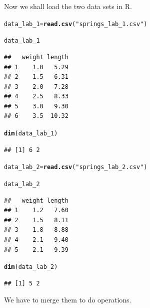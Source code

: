 \documentclass[11pt, a4paper]{article}\usepackage[]{graphicx}\usepackage[]{xcolor}
\makeatletter
\newcommand{\hlsng}[1]{\textcolor[rgb]{0.192,0.494,0.8}{#1}}%
\newcommand{\hldef}[1]{\textcolor[rgb]{0.345,0.345,0.345}{#1}}%
\newcommand{\hlkwb}[1]{\textcolor[rgb]{0.69,0.353,0.396}{#1}}%
\newcommand{\hlkwd}[1]{\textcolor[rgb]{0.737,0.353,0.396}{\textbf{#1}}}%
\newenvironment{kframe}{%
 \def\at@end@of@kframe{}%
 \ifinner\ifhmode%
  \def\at@end@of@kframe{\end{minipage}}%
  \begin{minipage}{\columnwidth}%
 \fi\fi%
 \def\FrameCommand##1{\hskip\@totalleftmargin \hskip-\fboxsep
 \colorbox{shadecolor}{##1}\hskip-\fboxsep
     \hskip-\linewidth \hskip-\@totalleftmargin \hskip\columnwidth}%
 \MakeFramed {\advance\hsize-\width
   \@totalleftmargin\z@ \linewidth\hsize
   \@setminipage}}%
 {\par\unskip\endMakeFramed%
 \at@end@of@kframe}
\newenvironment{knitrout}{}{} %
\makeatother
\begin{document}
Now we shall load the two data sets in R.

\begin{knitrout}
\color{fgcolor}\begin{kframe}
\begin{alltt}
\hldef{data_lab_1} \hlkwb{=} \hlkwd{read.csv}\hldef{(}\hlsng{"springs_lab_1.csv"}\hldef{)}

\hldef{data_lab_1}
\end{alltt}
\begin{verbatim}
##   weight length
## 1    1.0   5.29
## 2    1.5   6.31
## 3    2.0   7.28
## 4    2.5   8.33
## 5    3.0   9.30
## 6    3.5  10.32
\end{verbatim}
\begin{alltt}
\hlkwd{dim}\hldef{(data_lab_1)}
\end{alltt}
\begin{verbatim}
## [1] 6 2
\end{verbatim}
\end{kframe}
\end{knitrout}

\begin{knitrout}
\color{fgcolor}\begin{kframe}
\begin{alltt}
\hldef{data_lab_2} \hlkwb{=} \hlkwd{read.csv}\hldef{(}\hlsng{"springs_lab_2.csv"}\hldef{)}

\hldef{data_lab_2}
\end{alltt}
\begin{verbatim}
##   weight length
## 1    1.2   7.60
## 2    1.5   8.11
## 3    1.8   8.88
## 4    2.1   9.40
## 5    2.1   9.39
\end{verbatim}
\begin{alltt}
\hlkwd{dim}\hldef{(data_lab_2)}
\end{alltt}
\begin{verbatim}
## [1] 5 2
\end{verbatim}
\end{kframe}
\end{knitrout}

We have to merge them to do operations.
\end{document}

